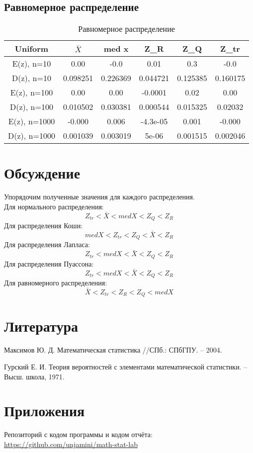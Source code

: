 \subsection{Равномерное распределение}
\begin{table}[H]
\caption{Равномерное распределение}
\begin{center}
 \begin{tabular}{||c || c c c c c||} 
 \hline
 Uniform & \(\bar{X}\)  &  med x & Z_{R} & Z_{Q} & Z_{tr} \\ 
 \hline\hline
  E(z), n=10 &   0.00 & -0.0 &  0.01 & 0.3  & -0.0 \\ 
 \hline
  D(z), n=10 & 0.098251 &  0.226369 &  0.044721 & 0.125385 &  0.160175 \\
 \hline
  E(z), n=100 & 0.00 &  0.00 & -0.0001 & 0.02 &  0.00 \\
 \hline
  D(z), n=100 & 0.010502 &  0.030381 &  0.000544 & 0.015325 &  0.02032 \\
 \hline
   E(z), n=1000 & -0.000 &  0.006 &  -4.3e-05 & 0.001 & -0.000  \\
 \hline
  D(z), n=1000 & 0.001039 &  0.003019 &   5e-06   & 0.001515 &  0.002046 \\
 \hline
\end{tabular}
\end{center}
\end{table}


\section{Обсуждение}
Упорядочим полученные значения для каждого распределения.\\
Для нормального распределения:
\[Z_{tr} < \bar{X} < med X < Z_{Q} < Z_{R}\]
Для распределения Коши:
\[med X < Z_{tr} < Z_{Q} < \bar{X} < Z_{R}\]
Для распределения Лапласа:
\[Z_{tr} < med X < \bar{X} < Z_{Q} < Z_{R}\]
Для распределения Пуассона:
\[Z_{tr} < med X < \bar{X}  < Z_{Q} < Z_{R}\]
Для равномерного распределения:
\[\bar{X} < Z_{tr} < Z_{R} < Z_{Q} < med X\]


\section{Литература}
Максимов Ю. Д. Математическая статистика //СПб.: СПбГПУ. – 2004.

Гурский Е. И. Теория вероятностей с элементами математической статистики. – Высш. школа, 1971.

\section{Приложения}

Репозиторий с кодом программы и кодом отчёта: \href{https://github.com/unjamini/math-stat-lab}{https://github.com/unjamini/math-stat-lab}



